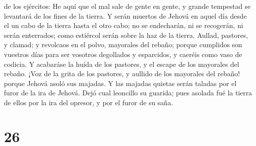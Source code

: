 de los ejércitos: He aquí que el mal sale de gente en gente, y grande
tempestad se levantará de los fines de la tierra.  Y
serán muertos de Jehová en aquel día desde el un cabo de la tierra hasta
el otro cabo; no se endecharán, ni se recogerán, ni serán enterrados;
como estiércol serán sobre la haz de la tierra.  Aullad,
pastores, y clamad; y revolcaos en el polvo, mayorales del rebaño;
porque cumplidos son vuestros días para ser vosotros degollados y
esparcidos, y caeréis como vaso de codicia.  Y acabaráse
la huída de los pastores, y el escape de los mayorales del rebaño.
 ¡Voz de la grita de los pastores, y aullido de los
mayorales del rebaño! porque Jehová asoló sus majadas.  Y
las majadas quietas serán taladas por el furor de la ira de Jehová.
 Dejó cual leoncillo su guarida; pues asolada fué la
tierra de ellos por la ira del opresor, y por el furor de su saña.

\hypertarget{section-25}{%
\section{26}\label{section-25}}

